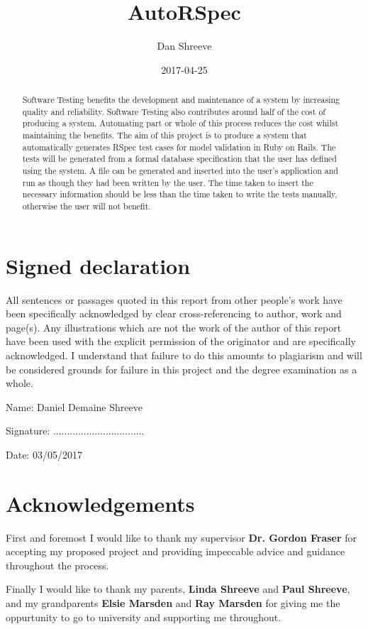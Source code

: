 \documentclass[a4paper,12pt]{article}
\title{AutoRSpec}
\date{2017-04-25}
\author{Dan Shreeve}
\begin{document}
\maketitle

\newpage
{}
\section*{Signed declaration}
All sentences or passages quoted in this report from other people's work have been specifically acknowledged by clear cross-referencing to author, work and page(s). Any illustrations which are not the work of the author of this report have been used with the explicit permission of the originator and are specifically acknowledged. I understand that failure to do this amounts to plagiarism and will be considered grounds for failure in this project and the degree examination as a whole.
\par Name: Daniel Demaine Shreeve
\par Signature: .................................
\par Date: 03/05/2017

\newpage
{}
\begin{abstract}
Software Testing benefits the development and maintenance of a system by increasing quality and reliability. Software Testing also contributes around half of the cost of producing a system. Automating part or whole of this process reduces the cost whilst maintaining the benefits. The aim of this project is to produce a system that automatically generates RSpec test cases for model validation in Ruby on Rails. The tests will be generated from a formal database specification that the user has defined using the system. A file can be generated and inserted into the user's application and run as though they had been written by the user. The time taken to insert the necessary information should be less than the time taken to write the tests manually, otherwise the user will not benefit.
\end{abstract}

\newpage
{}
\section*{Acknowledgements}
First and foremost I would like to thank my supervisor \textbf{Dr. Gordon Fraser} for accepting my proposed project and providing impeccable advice and guidance throughout the process.
\par Finally I would like to thank my parents, \textbf{Linda Shreeve} and \textbf{Paul Shreeve}, and my grandparents \textbf{Elsie Marsden} and \textbf{Ray Marsden} for giving me the oppurtunity to go to university and supporting me throughout.
\end{document}
